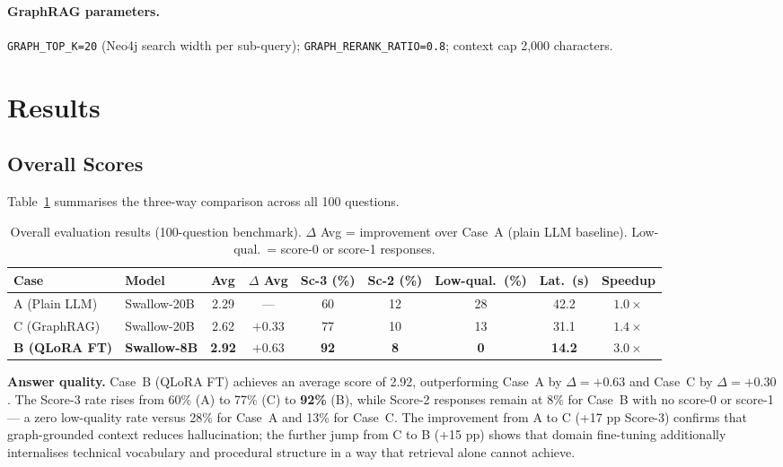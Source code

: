 \documentclass[twocolumn]{article}
\begin{document}
\paragraph{GraphRAG parameters.}
\texttt{GRAPH\_TOP\_K=20} (Neo4j search width per sub-query);
\texttt{GRAPH\_RERANK\_RATIO=0.8};
context cap 2,000 characters.

\section{Results}
\label{sec:results}

\subsection{Overall Scores}

Table~\ref{tab:overall} summarises the three-way comparison across all 100 questions.

\begin{table}[t]
  \centering
  \setlength{\tabcolsep}{4pt}
  \caption{Overall evaluation results (100-question benchmark). $\Delta$ Avg = improvement over Case~A (plain LLM baseline). Low-qual.\ = score-0 or score-1 responses.}
  \label{tab:overall}
  \begin{tabular}{@{}llccccccc@{}}
    \toprule
    Case & Model & Avg & $\Delta$ Avg & Sc-3 (\%) & Sc-2 (\%) & Low-qual.\ (\%) & Lat.\ (s) & Speedup \\
    \midrule
    A (Plain LLM)         & Swallow-20B         & 2.29          & ---              & 60          & 12          & 28          & 42.2          & $1.0\times$ \\
    C (GraphRAG)          & Swallow-20B         & 2.62          & $+0.33$          & 77          & 10          & 13          & 31.1          & $1.4\times$ \\
    \textbf{B (QLoRA FT)} & \textbf{Swallow-8B} & \textbf{2.92} & $\mathbf{+0.63}$ & \textbf{92} & \textbf{8}  & \textbf{0}  & \textbf{14.2} & $\mathbf{3.0\times}$ \\
    \bottomrule
  \end{tabular}
\end{table}

\textbf{Answer quality.}
Case~B (QLoRA FT) achieves an average score of 2.92, outperforming
Case~A by $\Delta=+0.63$ and Case~C by $\Delta=+0.30$.
The Score-3 rate rises from 60\% (A) to 77\% (C) to \textbf{92\%} (B),
while Score-2 responses remain at 8\% for Case~B with no score-0 or score-1---
a zero low-quality rate versus 28\% for Case~A and 13\% for Case~C.
The improvement from A to C (+17 pp Score-3) confirms that graph-grounded context
reduces hallucination; the further jump from C to B (+15 pp) shows that
domain fine-tuning additionally internalises technical vocabulary and procedural structure
in a way that retrieval alone cannot achieve.
\end{document}
